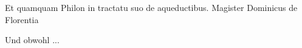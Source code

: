 \documentclass{book}
\begin{document}
\begin{pairs}
\begin{Leftside}
\beginnumbering
\pstart
Et quamquam Philon in tractatu suo de aqueductibus. Magister Dominicus de Florentia
\pend
\endnumbering
\end{Leftside}

\begin{Rightside}
\beginnumbering
\pstart
Und obwohl ...
\pend
\endnumbering
\end{Rightside}

\end{pairs}
\Columns
\end{document}
